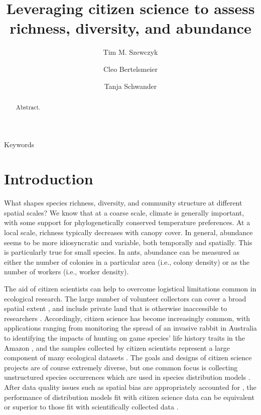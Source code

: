 \documentclass[preprint,review,times,12pt]{elsarticle}
\begin{document}
\begin{frontmatter}

\title{Leveraging citizen science to assess richness, diversity, and abundance}

\author[DEE]{Tim M. Szewczyk}
\author[DEE]{Cleo Bertelsmeier}
\author[DEE]{Tanja Schwander}

\address[DEE]{Department of Ecology and Evolution, University of Lausanne}


\begin{abstract}
Abstract.
\end{abstract}

\begin{keyword}
Keywords
\end{keyword}

\end{frontmatter}
\linenumbers



\section{Introduction}
\label{S:1}
What shapes species richness, diversity, and community structure at different spatial scales? We know that at a coarse scale, climate is generally important, with some support for phylogenetically conserved temperature preferences. At a local scale, richness typically decreases with canopy cover. In general, abundance seems to be more idiosyncratic and variable, both temporally and spatially. This is particularly true for small species. In ants, abundance can be measured as either the number of colonies in a particular area (i.e., colony density) or as the number of workers (i.e., worker density). 

The aid of citizen scientists can help to overcome logistical limitations common in ecological research. The large number of volunteer collectors can cover a broad spatial extent \citep{Theobald2015}, and include private land that is otherwise inaccessible to researchers \citep{Pernat2020}. Accordingly, citizen science has become increasingly common, with applications ranging from monitoring the spread of an invasive rabbit in Australia \citep{Roy-Dufresne2019} to identifying the impacts of hunting on game species' life history traits in the Amazon \citep{ElBizri2020}, and the samples collected by citizen scientists represent a large component of many ecological datasets \citep{Poisson2020}. The goals and designs of citizen science projects are of course extremely diverse, but one common focus is collecting unstructured species occurrences which are used in species distribution models \citep{Theobald2015,Steen2019,Duan2020,Henckel2020}. After data quality issues such as spatial bias are appropriately accounted for \citep{Isaac2014,Steen2019,Johnston2020,Robinson2020}, the performance of distribution models fit with citizen science data can be equivalent or superior to those fit with scientifically collected data \citep{Steen2019,Sumner2019,Henckel2020}. 
\end{document}
